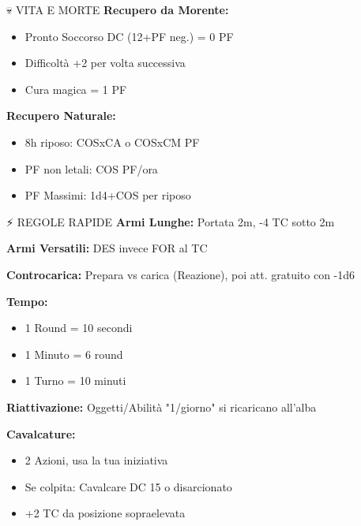 \documentclass[10pt,a4paper,landscape]{article}
\begin{document}
\begin{multicols}{4}
\begin{mainsection}{💀 VITA E MORTE}
			\textbf{Recupero da Morente:}
			\begin{itemize}[noitemsep,leftmargin=8pt]
				\item Pronto Soccorso DC (12+PF neg.) = 0 PF
				\item Difficoltà +2 per volta successiva
				\item Cura magica = 1 PF
			\end{itemize}

			\textbf{Recupero Naturale:}
			\begin{itemize}[noitemsep,leftmargin=8pt]
				\item 8h riposo: COSxCA o COSxCM PF
				\item PF non letali: COS PF/ora
				\item PF Massimi: 1d4+COS per riposo
			\end{itemize}
		\end{mainsection}

		\begin{mainsection}{⚡ REGOLE RAPIDE}
			\textbf{Armi Lunghe:} Portata 2m, -4 TC sotto 2m

			\textbf{Armi Versatili:} DES invece FOR al TC

			\textbf{Controcarica:} Prepara vs carica (Reazione), poi att. gratuito con -1d6

			\medskip

			\textbf{Tempo:}
			\begin{itemize}[noitemsep,leftmargin=8pt]
				\item 1 Round = 10 secondi
				\item 1 Minuto = 6 round
				\item 1 Turno = 10 minuti
			\end{itemize}

			\textbf{Riattivazione:} Oggetti/Abilità "1/giorno" si ricaricano all'alba

			\medskip

			\textbf{Cavalcature:}
			\begin{itemize}[noitemsep,leftmargin=8pt]
				\item 2 Azioni, usa la tua iniziativa
				\item Se colpita: Cavalcare DC 15 o disarcionato
				\item +2 TC da posizione sopraelevata
			\end{itemize}
		\end{mainsection}

	\end{multicols}
\end{document}
